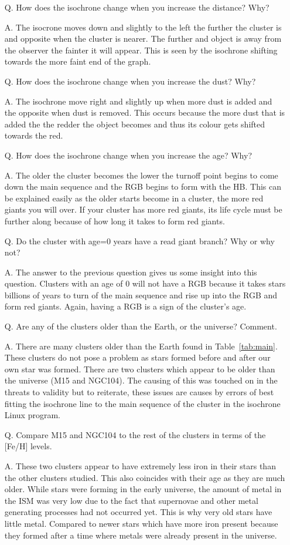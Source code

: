\documentclass{article}
\begin{document}
\begin{enumerate}

\item[Q.] How does the isochrone change when you increase the distance? Why?
\item[A.] The isocrone moves down and slightly to the left the further the cluster is
and opposite when the cluster is nearer. The further and object is away from the observer
the fainter it will appear. This is seen by the isochrone shifting towards the more faint
end of the graph.
\item[Q.] How does the isochrone change when you increase the dust? Why?
\item[A.] The isochrone move right and slightly up when more dust is added and the 
opposite when dust is removed. This occurs because the more dust that is added the
the redder the object becomes and thus its colour gets shifted towards the red.
\item[Q.] How does the isochrone change when you increase the age? Why?
\item[A.] The older the cluster becomes the lower the turnoff point begins to come
down the main sequence and the RGB begins to form with the HB. This can be explained
easily as the older starts become in a cluster, the more red giants you will over.
If your cluster has more red giants, its life cycle must be further along because
of how long it takes to form red giants.
\item[Q.] Do the cluster with age=0 years have a read giant branch? Why or why not?
\item[A.] The answer to the previous question gives us some insight into this question.
Clusters with an age of 0 will not have a RGB because it takes stars billions of
years to turn of the main sequence and rise up into the RGB and form red giants.
Again, having a RGB is a sign of the cluster's age.
\item[Q.] Are any of the clusters older than the Earth, or the universe? Comment.
\item[A.] There are many clusters older than the Earth found in Table~\ref{tab:main}.
These clusters do not pose a problem as stars formed before and after our own 
star was formed. There are two clusters which appear to be older than the universe
(M15 and NGC104). The causing of this was touched on in the threats to validity
but to reiterate, these issues are causes by errors of best fitting the isochrone
line to the main sequence of the cluster in the isochrone Linux program.
\item[Q.] Compare M15 and NGC104 to the rest of the clusters in terms of the [Fe/H] levels. 
\item[A.] These two clusters appear to have extremely less iron in their stars than
the other clusters studied. This also coincides with their age as they are much older.
While stars were forming in the early universe, the amount of metal in the ISM
was very low due to the fact that supernovae and other metal generating processes
had not occurred yet. This is why very old stars have little metal. Compared to newer
stars which have more iron present because they formed after a time where metals
were already present in the universe.


\end{enumerate}
\end{document}
